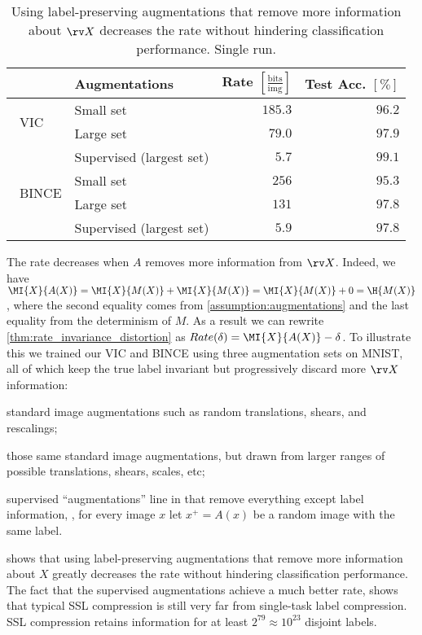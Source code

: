 \documentclass[final]{article}
\begin{document}
\begin{table}[h]
\caption{
Using label-preserving augmentations that remove more information about $\rv X$ decreases the rate without hindering classification performance.
Single run.
}
\small
\center
\begin{tabular}{llrr}
\toprule
&Augmentations& Rate $[\frac{\text{bits}}{\text{img}}]$ & Test Acc. $[\%]$  \\ 
\midrule 
\multirow{2}{*}{\centering  ~VIC } 
 & Small set  &  $185.3$  & $96.2$   \\ 
  & Large set  &  $79.0$  & $97.9$   \\ 
   & Supervised (largest set)  &  $5.7$  & $99.1$   \\ 
\midrule 
\multirow{2}{*}{\centering  ~BINCE  }
 & Small set  &  $256$  & $95.3$   \\ 
  & Large set  &  $131$  & $97.8$   \\ 
   & Supervised (largest set)  &  $5.9$  & $97.8$   \\ 
\bottomrule
\end{tabular}
\label{table:mnist_augmentations}
\end{table} 

The rate decreases when $A$ removes more information from $\rv X$.
Indeed, we have $\MI{X}{A(X)} = \MI{X}{M(X)} + \MI{X}{M(X)} = \MI{X}{M(X)} + 0 = \H{M(X)}$, where the second equality comes from \cref{assumption:augmentations} and the last equality from the determinism of $M$.
As a result we can rewrite \cref{thm:rate_invariance_distortion} as $Rate(\delta) = \MI{X}{A(X)} - \delta$.
To illustrate this we trained our VIC and BINCE using three augmentation sets on MNIST, all of which keep the true label invariant but progressively discard more $\rv X$ information:
\begin{inlinelist}
\item standard image augmentations such as random translations, shears, and rescalings;
\item those same standard image augmentations, but drawn from larger ranges of possible translations, shears, scales, etc;
\item supervised ``augmentations'' line in \cite{khosla_supervised_2020} that remove everything except label information, \ie, for every image $x$  let $x^+ = A(x)$ be a random image with the same label.
\end{inlinelist}
 shows that using label-preserving augmentations that remove more information about $X$ greatly decreases the rate without hindering classification performance.
The fact that the supervised augmentations achieve a much better rate, shows that typical SSL compression is still very far from single-task label compression.
SSL compression retains information for at least $2^{79} \approx 10^{23}$ disjoint labels.
\end{document}
